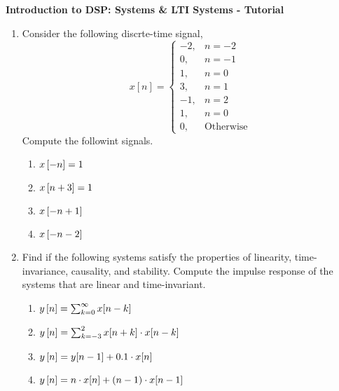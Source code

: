 \documentclass[12pt]{article}
\def\ls{\ensuremath\left[}
\def\rs{\ensuremath\right]}
\begin{document}
\begin{center}
    \begin{Large}
        \textbf{Introduction to DSP: Systems \& LTI Systems - Tutorial}
    \end{Large}
\end{center}
\vspace{0.2cm}

\begin{enumerate}
    \item Consider the following discrte-time signal,
    \[ x[n] = \begin{cases}
    -2, & n = -2\\
     0, & n = -1\\
     1, & n = 0\\
     3, & n = 1\\
    -1, & n = 2\\
     1, & n = 0\\
     0, & \text{Otherwise}
     \end{cases} \]
    Compute the followint signals.
    \begin{enumerate}
        \item $x\ls -n \rs = 1$ \vspace{3cm}
        \item $x\ls n + 3 \rs = 1$ \vspace{3cm}
        \item $x\ls -n + 1\rs$ \vspace{3cm}
        \item $x\ls -n -2 \rs$ \vspace{3cm}
    \end{enumerate}
    \newpage

    \item Find if the following systems satisfy the properties of linearity, time-invariance, causality, and stability. Compute the impulse response of the systems that are linear and time-invariant.
    \begin{enumerate}
        \item $y\ls n \rs = \sum_{k=0}^{\infty} x[n-k]$ \vspace{12cm}
        \item $y\ls n \rs = \sum_{k=-3}^{2} x[n+k] \cdot x[n-k]$ \vspace{12cm}
        \item $y\ls n\rs = y[n-1] + 0.1 \cdot x[n]$ \vspace{12cm}
        \item $y\ls n \rs = n \cdot x[n] + (n-1) \cdot x[n-1]$
    \end{enumerate}
    \newpage


\end{enumerate}
\end{document}
